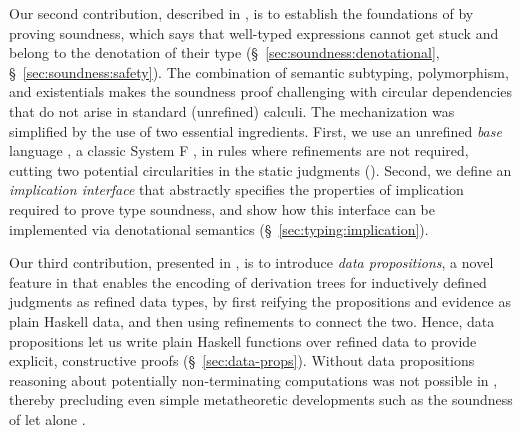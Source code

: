 %
Our second contribution,
described in ,
is to establish the foundations
of \sysrf by proving soundness,
which says that well-typed expressions cannot get stuck
and belong to the denotation of their type 
(\S~\ref{sec:soundness:denotational}, \S~\ref{sec:soundness:safety}).                                   %
%
%
The combination of semantic subtyping, polymorphism,
and existentials makes the soundness proof challenging
with circular dependencies that do not arise in standard
(unrefined) calculi.
%
The mechanization was simplified by the use of
two essential ingredients.
%
First, we use an unrefined \emph{base} language
\sysf, a classic System F \cite{TAPL}, in rules
where refinements are not required, cutting two potential
circularities in the static judgments ().
Second, we define an \emph{implication interface}
that abstractly specifies the properties of implication
required to prove type soundness, and show how this interface
can be implemented via denotational semantics 
(\S~\ref{sec:typing:implication}).                          %

%
Our third contribution,
presented in , is to introduce 
\textit{data propositions}, a novel feature in \lh
that enables the encoding of derivation trees for inductively
defined judgments as refined data types, by first reifying
the propositions and evidence as plain Haskell data, and then
using refinements to connect the two.
%
Hence, data propositions let us write plain Haskell functions
over refined data to provide explicit, 
constructive proofs (\S~\ref{sec:data-props}).              %
%
Without data propositions reasoning about
potentially non-terminating computations was not possible in \lh,
thereby precluding even simple
metatheoretic developments such as the soundness
of \sysf let alone \sysrf.

